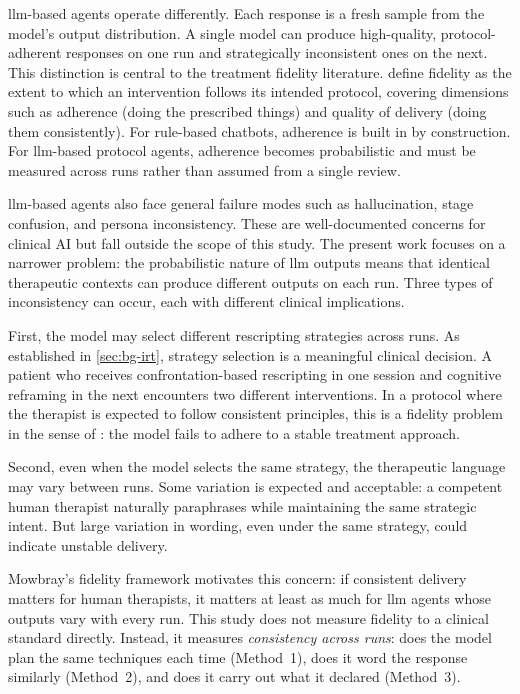 \gls{llm}-based agents operate differently. Each response is a fresh sample
from the model's output distribution. A single model can produce
high-quality, protocol-adherent responses on one run and strategically
inconsistent ones on the next. This distinction is central to the treatment fidelity literature.
\textcite{TYX7W5ZM} define fidelity as the extent to which an
intervention follows its intended protocol, covering dimensions such as
adherence (doing the prescribed things) and quality of delivery (doing
them consistently). For rule-based chatbots, adherence is
built in by construction. For \gls{llm}-based protocol agents, adherence
becomes probabilistic and must be measured across runs rather than assumed
from a single review.

\gls{llm}-based agents also face general failure modes such as hallucination,
stage confusion, and persona inconsistency. These are well-documented
concerns for clinical AI but fall outside the scope of this study. The
present work focuses on a narrower problem: the probabilistic nature of
\gls{llm} outputs means that identical therapeutic contexts can produce
different outputs on each run. Three types of inconsistency can occur,
each with different clinical implications.

First, the model may select different rescripting strategies across runs.
As established in \autoref{sec:bg-irt}, strategy selection is a
meaningful clinical decision. A patient who receives confrontation-based
rescripting in one session and cognitive reframing in the next encounters
two different interventions. In a protocol where the therapist is expected
to follow consistent principles, this is a fidelity problem in the sense
of \textcite{TYX7W5ZM}: the model fails to adhere to a stable treatment
approach.

Second, even when the model selects the same strategy, the therapeutic
language may vary between runs. Some variation is expected and acceptable:
a competent human therapist naturally paraphrases while maintaining the
same strategic intent. But large variation in wording, even under the same
strategy, could indicate unstable delivery.

Mowbray's fidelity framework
motivates this concern: if consistent delivery matters for human
therapists, it matters at least as much for \gls{llm} agents whose
outputs vary with every run. This study does not measure fidelity to a
clinical standard directly. Instead, it measures \emph{consistency across
runs}: does the model plan the same techniques each time (Method~1), does
it word the response similarly (Method~2), and does it carry out what it
declared (Method~3).

